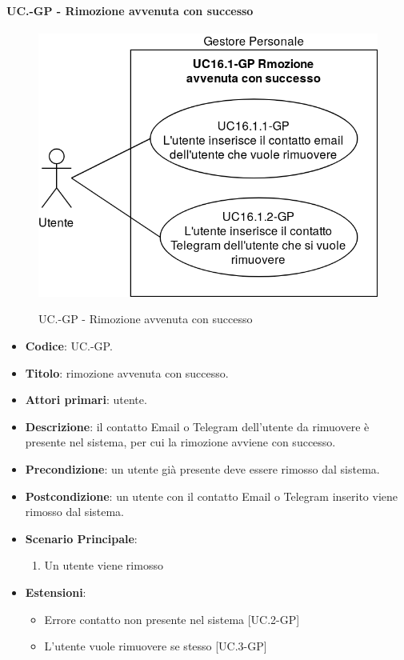 	\paragraph{UC\theuccount.\thesubuccount-GP - Rimozione avvenuta con successo}
		\begin{figure}[H]
			\centering
			\includegraphics[width=\columnwidth]{img/casi_d'uso/UC16_1.png}\\
			\caption{UC\theuccount.\thesubuccount-GP - Rimozione avvenuta con successo}
		\end{figure}
		\begin{itemize}
			\item \textbf{Codice}: UC\theuccount.\thesubuccount-GP.
			\item \textbf{Titolo}: rimozione avvenuta con successo.
			\item \textbf{Attori primari}: utente.
			\item \textbf{Descrizione}: il contatto Email o Telegram dell'utente da rimuovere è presente nel sistema, per cui la rimozione avviene con successo.
			\item \textbf{Precondizione}: un utente già presente deve essere rimosso dal sistema.
			\item \textbf{Postcondizione}: un utente con il contatto Email o Telegram inserito viene rimosso dal sistema.
			\item \textbf{Scenario Principale}:
			\begin{enumerate}
				\item Un utente viene rimosso
			\end{enumerate}
			\item \textbf{Estensioni}:
			\begin{itemize}
				\item Errore contatto non presente nel sistema [UC\theuccount.2-GP]
				\item L'utente vuole rimuovere se stesso [UC\theuccount.3-GP]
			\end{itemize}
		\end{itemize}
			
